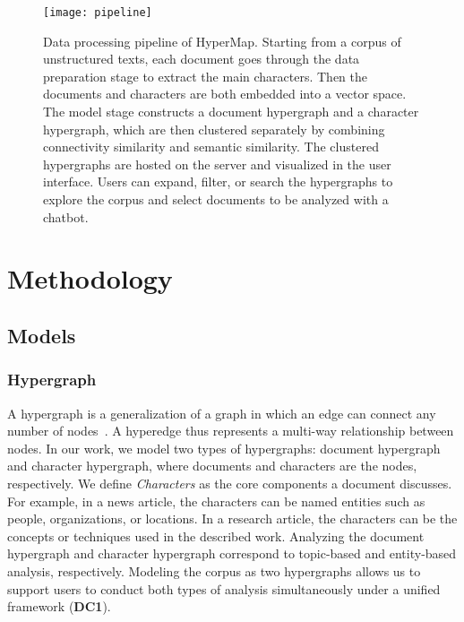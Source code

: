 \begin{figure*}[t]
 \centering %
 \texttt{[image: pipeline]}
 \caption{Data processing pipeline of HyperMap. 
 Starting from a corpus of unstructured texts, each document goes through the data preparation stage to extract the main characters.
 Then the documents and characters are both embedded into a vector space.
 The model stage constructs a document hypergraph and a character hypergraph, which are then clustered separately by combining connectivity similarity and semantic similarity.
 The clustered hypergraphs are hosted on the server and visualized in the user interface.
 Users can expand, filter, or search the hypergraphs to explore the corpus and select documents to be analyzed with a chatbot.
  }
\label{fig:pipeline}
\end{figure*}
\section{Methodology}\label{sec: methodology}
\subsection{Models}
\subsubsection{Hypergraph}
A hypergraph is a generalization of a graph in which an edge can connect any number of nodes~\cite{fischer2021hypergraphsurvey}.
A hyperedge thus represents a multi-way relationship between nodes.
In our work, we model two types of hypergraphs: document hypergraph and character hypergraph, where documents and characters are the nodes, respectively.
We define \textit{Characters} as the core components a document discusses.
For example, in a news article, the characters can be named entities such as people, organizations, or locations.
In a research article, the characters can be the concepts or techniques used in the described work.
Analyzing the document hypergraph and character hypergraph correspond to topic-based and entity-based analysis, respectively.
Modeling the corpus as two hypergraphs allows us to support users to conduct both types of analysis simultaneously under a unified framework (\textbf{DC1}).

